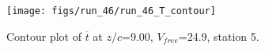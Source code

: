 \begin{figure}[H]
\centering
\texttt{[image: figs/run\_46/run\_46\_T\_contour]}
\caption{Contour plot of $\overline{t}$ at $z/c$=9.00, $V_{free}$=24.9, station 5.}
\end{figure}


